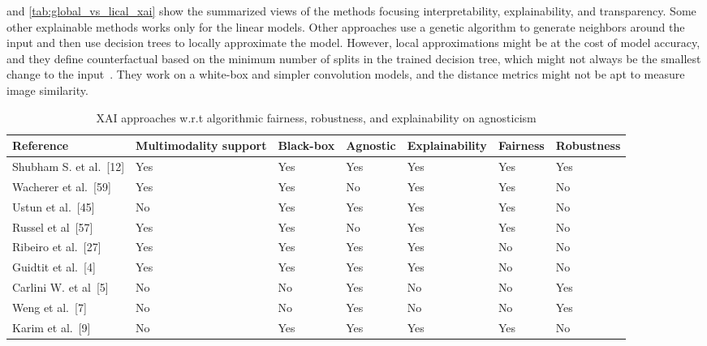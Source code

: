 \hspace*{3.5mm}  and \cref{tab:global_vs_lical_xai} show the summarized views of the methods focusing interpretability, explainability, and transparency. Some other explainable methods works only for the linear models. Other approaches use a genetic algorithm to generate neighbors around the input and then use decision trees to locally approximate the model. However, local approximations might be at the cost of model accuracy, and they define counterfactual based on the minimum number of splits in the trained decision tree, which might not always be the smallest change to the input~\cite{li2017comprehensive}. They work on a white-box and simpler convolution models, and the distance metrics might not be apt to measure image similarity. 

\begin{table}[h]
    \centering
    \caption{XAI approaches w.r.t algorithmic fairness, robustness, and explainability on agnosticism}
    \label{tab:multimodal_xai_approaches}
    \scriptsize
    \vspace{-2mm}
    \begin{tabular}{l|l|l|l|l|l|l} 
        \hline
        \textbf{Reference}                & \textbf{Multimodality support} & \textbf{Black-box} & \textbf{Agnostic} & \textbf{Explainability} & \textbf{Fairness} & \textbf{Robustness}  \\ 
        \hline
        Shubham S. et al.~[12]   & Yes                   & Yes       & Yes            & Yes            & Yes      & Yes         \\ 
        \hline
        Wacherer et al.~[59]     & Yes                   & Yes       & No             & Yes            & Yes      & No          \\ 
        \hline
        Ustun et al.~[45]        & No                    & Yes       & Yes            & Yes            & Yes      & No          \\ 
        \hline
        Russel et al~[57]       & Yes                   & Yes       & No             & Yes            & Yes      & No          \\ 
        \hline
        Ribeiro et al.~[27]      & Yes                   & Yes       & Yes            & Yes            & No       & No          \\ 
        \hline
        Guidtit et al.~[4]      & Yes                   & Yes       & Yes            & Yes            & No       & No          \\ 
        \hline
        Carlini W. et al~[5] & No                    & No        & Yes            & No             & No       & Yes         \\ 
        \hline
        Weng et al.~[7]          & No                    & No        & Yes            & No             & No       & Yes         \\ 
        \hline
        Karim et al.~[9]        & No                    & Yes       & Yes            & Yes            & Yes      & No          \\
        \hline
    \end{tabular}
    \vspace{-4mm}
\end{table}

